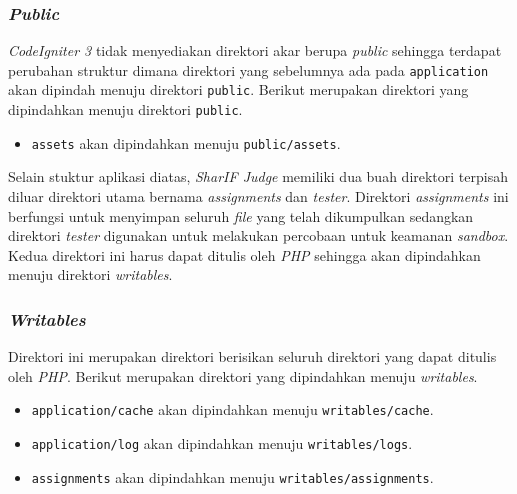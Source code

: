\subsubsection{\textit{Public}}
\textit{CodeIgniter 3} tidak menyediakan direktori akar berupa \textit{public} sehingga terdapat perubahan struktur dimana direktori yang sebelumnya ada pada \texttt{application} akan dipindah menuju direktori \texttt{public}. Berikut merupakan direktori yang dipindahkan menuju direktori \texttt{public}.
\begin{itemize}
\item \verb|assets| akan dipindahkan menuju \texttt{public/assets}.
\end{itemize}

Selain stuktur aplikasi diatas, \textit{SharIF Judge} memiliki dua buah direktori terpisah diluar direktori utama bernama \textit{assignments} dan \textit{tester}. Direktori \textit{assignments} ini berfungsi untuk menyimpan seluruh \textit{file} yang telah dikumpulkan sedangkan direktori \textit{tester} digunakan untuk melakukan percobaan untuk keamanan \textit{sandbox}. Kedua direktori ini harus dapat ditulis oleh \textit{PHP} sehingga akan dipindahkan menuju direktori \textit{writables}.

\subsubsection{\textit{Writables}}
Direktori ini merupakan direktori berisikan seluruh direktori yang dapat ditulis oleh \textit{PHP}. Berikut merupakan direktori yang dipindahkan menuju \textit{writables}.
\begin{itemize}
\item \verb|application/cache| akan dipindahkan menuju \texttt{writables/cache}.
\item \verb|application/log| akan dipindahkan menuju \texttt{writables/logs}.
\item \verb|assignments| akan dipindahkan menuju \texttt{writables/assignments}.
\end{itemize}

